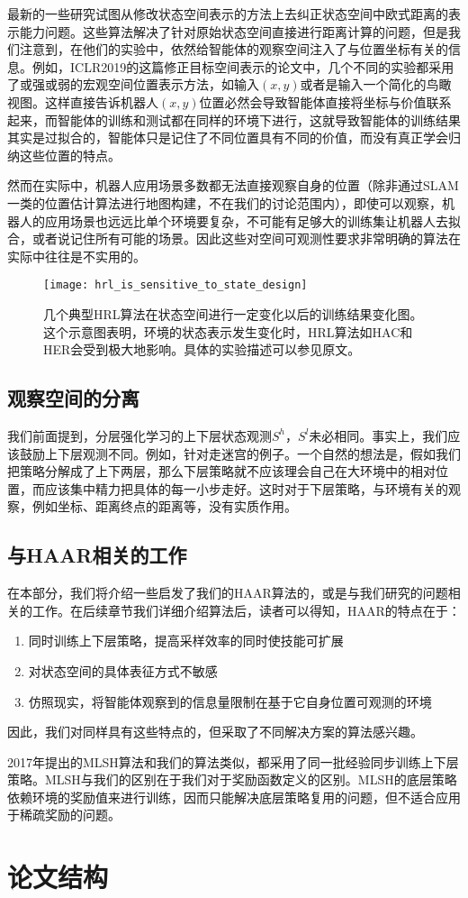 最新的一些研究试图从修改状态空间表示的方法上去纠正状态空间中欧式距离的表示能力问题\cite{goal-conditioned}\cite{goal_repr_learning}。这些算法解决了针对原始状态空间直接进行距离计算的问题，但是我们注意到，在他们的实验中，依然给智能体的观察空间注入了与位置坐标有关的信息。例如，ICLR2019的这篇修正目标空间表示的论文中\cite{goal_repr_learning}，几个不同的实验都采用了或强或弱的宏观空间位置表示方法，如输入$(x, y)$或者是输入一个简化的鸟瞰视图。这样直接告诉机器人$(x, y)$位置必然会导致智能体直接将坐标与价值联系起来，而智能体的训练和测试都在同样的环境下进行，这就导致智能体的训练结果其实是过拟合的，智能体只是记住了不同位置具有不同的价值，而没有真正学会归纳这些位置的特点。

然而在实际中，机器人应用场景多数都无法直接观察自身的位置（除非通过SLAM一类的位置估计算法进行地图构建，不在我们的讨论范围内），即使可以观察，机器人的应用场景也远远比单个环境要复杂，不可能有足够大的训练集让机器人去拟合，或者说记住所有可能的场景。因此这些对空间可观测性要求非常明确的算法在实际中往往是不实用的。

\begin{figure}[h] %
  \centering
  \texttt{[image: hrl\_is\_sensitive\_to\_state\_design]}
  \caption{几个典型HRL算法在状态空间进行一定变化以后的训练结果变化图\cite{sensitive_to_goal_space}。这个示意图表明，环境的状态表示发生变化时，HRL算法如HAC和HER会受到极大地影响。具体的实验描述可以参见原文。}
  \label{fig:sensitive_to_goal}
\end{figure}

\subsection{观察空间的分离}
我们前面提到，分层强化学习的上下层状态观测$S^h$，$S^l$未必相同。事实上，我们应该鼓励上下层观测不同。例如，针对走迷宫的例子。一个自然的想法是，假如我们把策略分解成了上下两层，那么下层策略就不应该理会自己在大环境中的相对位置，而应该集中精力把具体的每一小步走好。这时对于下层策略，与环境有关的观察，例如坐标、距离终点的距离等，没有实质作用。

\subsection{与HAAR相关的工作}
在本部分，我们将介绍一些启发了我们的HAAR算法的，或是与我们研究的问题相关的工作。在后续章节我们详细介绍算法后，读者可以得知，HAAR的特点在于：
\begin{enumerate}
  \item 同时训练上下层策略，提高采样效率的同时使技能可扩展
  \item 对状态空间的具体表征方式不敏感
  \item 仿照现实，将智能体观察到的信息量限制在基于它自身位置可观测的环境
\end{enumerate}

因此，我们对同样具有这些特点的，但采取了不同解决方案的算法感兴趣。

2017年提出的MLSH算法\cite{MLSH}和我们的算法类似，都采用了同一批经验同步训练上下层策略。MLSH与我们的区别在于我们对于奖励函数定义的区别。MLSH的底层策略依赖环境的奖励值来进行训练，因而只能解决底层策略复用的问题，但不适合应用于稀疏奖励的问题。

\section{论文结构}